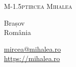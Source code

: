 \documentclass[12pt,a4paper]{article}
\makeatletter
\def\myemail{mircea@mihalea.ro}
\def\myweb{https://mihalea.ro}
\makeatother
\begin{document}
\flushbottom
\pagestyle{fancy} \setlength\headwidth{6.5in}
 \cfoot{}
\thispagestyle{empty}
\begin{adjustwidth}{-1in}{}
{\Huge
  {\textsc{%
    {M}\kern-1.5ptircea
    {M}ihalea}
  }
}
\hfill\hfill\hfill
{
  \begin{minipage}[b]{2in}
    \flushleft \footnotesize
    Brașov\\
    România
  \end{minipage}
  \hfill
  \begin{minipage}[b]{1.2in}
    \flushright \footnotesize
    \href{mailto:\myemail}{\myemail} \\
    \href{\myweb}{\myweb}
  \end{minipage}
}\par
\hrulefill
\end{adjustwidth}
\reversemarginpar
\setlength\marginparwidth{0.85in}





% 



\end{document}
